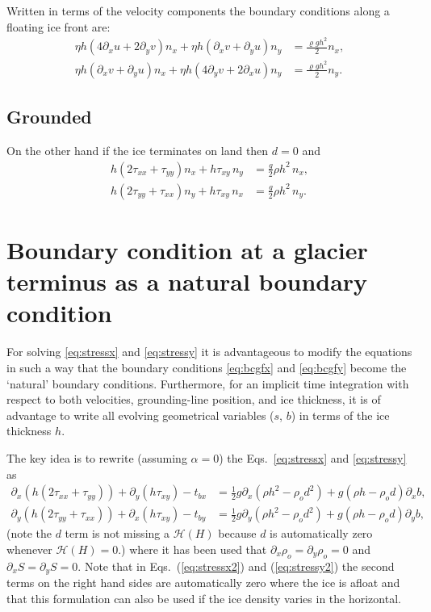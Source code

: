 \documentclass[10pt,a4paper]{book}
\newcommand{\He}{\mathcal{H}}
\newcommand{\p}{\partial}
\newcommand{\tbx}{t_{bx}}
\newcommand{\tby}{t_{by}}
\newcommand{\txx}{\tau_{xx}}
\newcommand{\tyy}{\tau_{yy}}
\newcommand{\txy}{\tau_{xy}}
\begin{document}
Written in terms of the velocity components the boundary conditions along a floating ice front are:
\begin{align}
  \eta h (4 \p_x u + 2  \p_y v) n_x + \eta h (\p_x v +\p_y u) n_y &= \frac{\varrho g h^2 }{2}  n_x,\\
\eta h (\p_x v + \p_y u) n_x + \eta h ( 4 \p_y v + 2 \p_x u) n_y &= \frac{\varrho g h^2 }{2}  n_y.
\end{align}

\subsection{Grounded} 
On the other hand if the ice terminates on land then $d=0$ and 
\begin{align}
h (2 \txx + \tyy) n_x + h \txy \,n_y &=  \frac{g}{2} \rho h^2 \, n_x ,\label{eq:bcgfxgrounded} \\
h (2 \tyy + \txx) n_y + h \txy \, n_x &=  \frac{g}{2} \rho h^2 \, n_y .\label{eq:bcgfygrounded} 
\end{align}

\section{Boundary condition at a glacier terminus as a natural boundary condition}

For solving \eqref{eq:stressx} and \eqref{eq:stressy} it is
advantageous to modify the equations in such a way that the boundary
conditions \eqref{eq:bcgfx} and \eqref{eq:bcgfy} become the `natural'
boundary conditions. Furthermore, for an implicit time integration
with respect to both velocities, grounding-line position, and ice
thickness, it is of advantage to write all evolving geometrical
variables ($s$, $b$) in terms of the ice thickness $h$.

The key idea is to rewrite (assuming $\alpha=0$) the Eqs.~\eqref{eq:stressx} and \eqref{eq:stressy} as
\begin{align} 
\p_x ( h ( 2 \txx + \tyy)) +\p_y ( h \txy) - \tbx
&=\frac{1}{2} g \p_x (\rho h^2 - \rho_o d^2)+g(\rho h -\rho_o d) \p_x b ,
\label{eq:stressx2}\\
\p_y (  h ( 2 \tyy + \txx)) +\p_x ( h \txy ) - \tby
&=\frac{1}{2} g \p_y (\rho h^2 - \rho_o d^2)+g(\rho h -\rho_o d) \p_y b ,
\label{eq:stressy2}
\end{align}
(note the $d$ term is not missing a $\He(H)$ because $d$ is automatically zero whenever $\He(H)=0$.)
where it has been used that $\p_x \rho_o=\p_y \rho_o=0$ and $\p_x S
=\p_y S=0$.  Note that in Eqs.~(\ref{eq:stressx2}) and
(\ref{eq:stressy2}) the second terms on the right hand sides are automatically zero
where the ice is afloat and that this formulation can also be used if the
ice density varies in the horizontal.
\end{document}
